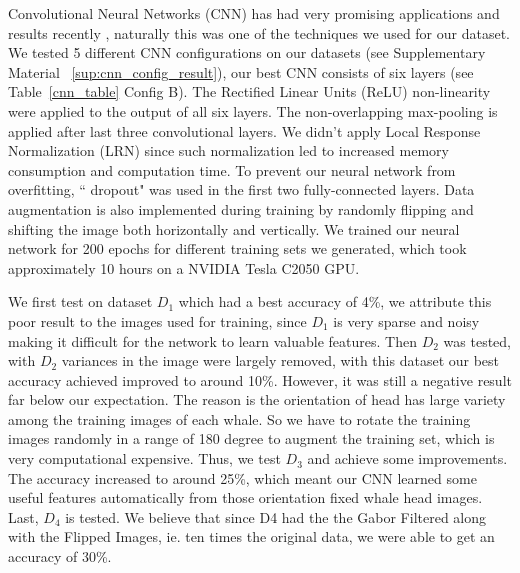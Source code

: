 Convolutional Neural Networks (CNN) has had very promising applications and results recently \cite{farabet2013learning, simonyan2014very, sermanet2013overfeat, krizhevsky2012imagenet}, naturally this was one of the techniques we used for our dataset. We tested 5 different CNN configurations on our datasets (see Supplementary Material ~\ref{sup:cnn_config_result}), our best CNN consists of six layers (see Table~\ref{cnn_table} Config B). The Rectified Linear Units (ReLU) non-linearity\cite{glorot2011deep} were  applied to the output of all six layers. The non-overlapping max-pooling is applied after last three convolutional layers. We didn't apply Local Response Normalization (LRN) since such normalization led to increased memory consumption and computation time\cite{simonyan2014very}. To prevent our neural network from overfitting, `` dropout"\cite{srivastava2014dropout} was used in the first two fully-connected layers. Data augmentation is also implemented during training by randomly flipping and shifting the image both horizontally and vertically. We trained our neural network for 200 epochs for different training sets we generated, which took approximately 10 hours on a NVIDIA Tesla C2050 GPU.

We first test on dataset $D_{1}$ which had a best accuracy of 4\%, we attribute this poor result to the images used for training, since $D_{1}$ is very sparse and noisy making it difficult for the network to learn valuable features. Then $D_{2}$ was tested, with $D_{2}$ variances in the image were largely removed, with this dataset our best accuracy achieved improved to around 10\%. However, it was still a negative result far below our expectation. The reason is the orientation of head has large variety among the training images of each whale. So we have to rotate the training images randomly in a range of 180 degree to augment the training set, which is very computational expensive. Thus, we test $D_{3}$ and achieve some improvements. The accuracy increased to around 25\%, which meant our CNN learned some useful features automatically from those orientation fixed whale head images. Last, $D_{4}$ is tested. We believe that since D4 had the the Gabor Filtered along with the Flipped Images, ie. ten times the original data, we were able to get an accuracy of 30\%. 

